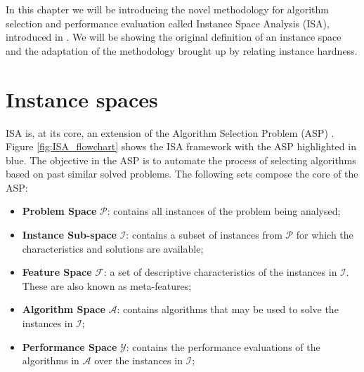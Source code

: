In this chapter we will be introducing the novel methodology for algorithm selection and performance evaluation called Instance Space Analysis (ISA), introduced in \cite{Munoz2018}. We will be showing the original definition of an instance space and the adaptation of the methodology brought up by \cite{Lorena2022} relating instance hardness.

\section{Instance spaces}

ISA is, at its core, an extension of the Algorithm Selection Problem (ASP) \cite{RICE1976}. Figure \ref{fig:ISA_flowchart} shows the ISA framework with the ASP highlighted in blue. The objective in the ASP is to automate the process of selecting algorithms based on past similar solved problems. The following sets compose the core of the ASP:

\begin{itemize}
	\item \textbf{Problem Space} $\mathcal{P}$: contains all instances of the problem being analysed;
	\item \textbf{Instance Sub-space} $\mathcal{I}$: contains a subset of instances from $\mathcal{P}$ for which the characteristics and solutions are available;
	\item \textbf{Feature Space} $\mathcal{F}$: a set of descriptive characteristics of the instances in $\mathcal{I}$. These are also known as meta-features;
	\item \textbf{Algorithm Space} $\mathcal{A}$: contains algorithms that may be used to solve the instances in $\mathcal{I}$;
	\item \textbf{Performance Space} $\mathcal{Y}$: contains the performance evaluations of the algorithms in $\mathcal{A}$ over the instances in $\mathcal{I}$;
\end{itemize}

